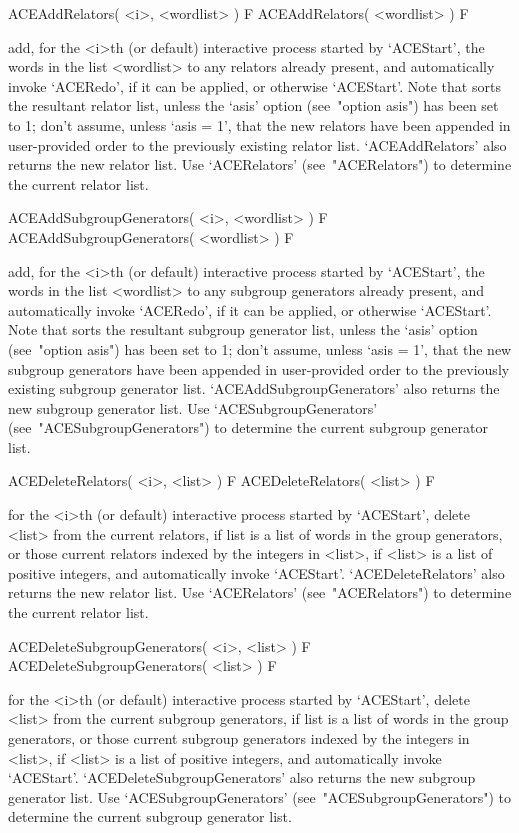 \>ACEAddRelators( <i>, <wordlist> ) F
\>ACEAddRelators( <wordlist> ) F

add, for the <i>th (or default) interactive {\ACE} process started  by
`ACEStart', the words in the list <wordlist> to any  relators  already
present, and automatically invoke `ACERedo', if it can be applied,  or
otherwise `ACEStart'. Note that {\ACE}  sorts  the  resultant  relator
list, unless the `asis' option (see~"option asis") has been set to  1;
don't assume, unless `asis = 1',  that  the  new  relators  have  been
appended in user-provided order to  the  previously  existing  relator
list.  `ACEAddRelators'  also  returns  the  new  relator  list.   Use
`ACERelators' (see~"ACERelators") to  determine  the  current  relator
list.

\>ACEAddSubgroupGenerators( <i>, <wordlist> ) F
\>ACEAddSubgroupGenerators( <wordlist> ) F

add, for the <i>th (or default) interactive {\ACE} process started  by
`ACEStart',  the  words  in  the  list  <wordlist>  to  any   subgroup
generators already present, and automatically invoke `ACERedo', if  it
can be applied, or otherwise `ACEStart'. Note that  {\ACE}  sorts  the
resultant  subgroup  generator  list,   unless   the   `asis'   option
(see~"option asis") has been set to 1; don't assume,  unless  `asis  =
1',  that  the  new  subgroup  generators  have   been   appended   in
user-provided order to  the  previously  existing  subgroup  generator
list.  `ACEAddSubgroupGenerators'  also  returns  the   new   subgroup
generator          list.          Use          `ACESubgroupGenerators'
(see~"ACESubgroupGenerators")  to  determine  the   current   subgroup
generator list.

\>ACEDeleteRelators( <i>, <list> ) F
\>ACEDeleteRelators( <list> ) F

for the <i>th (or  default)  interactive  {\ACE}  process  started  by
`ACEStart', delete <list> from the current relators, if list is a list
of words in the group generators, or those current relators indexed by
the integers in <list>, if <list> is a list of positive integers,  and
automatically invoke `ACEStart'. `ACEDeleteRelators' also returns  the
new relator list. Use `ACERelators' (see~"ACERelators")  to  determine
the current relator list.

\>ACEDeleteSubgroupGenerators( <i>, <list> ) F
\>ACEDeleteSubgroupGenerators( <list> ) F

for the <i>th (or  default)  interactive  {\ACE}  process  started  by
`ACEStart', delete <list> from the  current  subgroup  generators,  if
list is a list of words in the  group  generators,  or  those  current
subgroup generators indexed by the integers in <list>, if <list> is  a
list  of  positive  integers,  and  automatically  invoke  `ACEStart'.
`ACEDeleteSubgroupGenerators' also returns the new subgroup  generator
list.  Use  `ACESubgroupGenerators'  (see~"ACESubgroupGenerators")  to
determine the current subgroup generator list.


